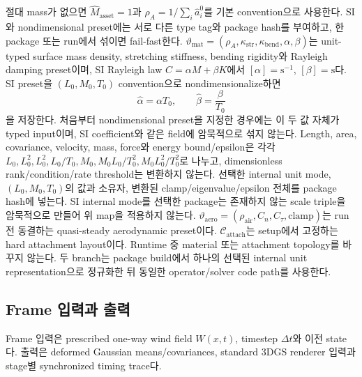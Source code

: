 \documentclass[11pt]{article}
\begin{document}
절대 mass가 없으면 \(\widehat M_{\mathrm{asset}}=1\)과
\(\widehat\rho_A=1/\sum_i\widehat a_i^0\)를 기본 convention으로 사용한다.
SI와 nondimensional preset에는 서로 다른 type tag와 package hash를 부여하고,
한 package 또는 run에서 섞이면 fail-fast한다.
\(\vartheta_{\mathrm{mat}}
=(\rho_A,\kappa_{\mathrm{str}},\kappa_{\mathrm{bend}},\alpha,\beta)\)는
unit-typed surface mass density, stretching stiffness, bending rigidity와 Rayleigh damping preset이며,
SI Rayleigh law \(C=\alpha M+\beta K\)에서
\([\alpha]=\mathrm{s}^{-1}\), \([\beta]=\mathrm{s}\)다.
SI preset을 \((L_0,M_0,T_0)\) convention으로 nondimensionalize하면
\begin{equation}
  \widehat\alpha=\alpha T_0,\qquad
  \widehat\beta=\frac{\beta}{T_0}
  \label{eq:minimal-rayleigh-unit-map}
\end{equation}
을 저장한다. 처음부터 nondimensional preset을 지정한 경우에는 이 두 값 자체가 typed input이며,
SI coefficient와 같은 field에 암묵적으로 섞지 않는다.
Length, area, covariance, velocity, mass, force와 energy bound/epsilon은 각각
\(L_0,L_0^2,L_0^2,L_0/T_0,M_0,M_0L_0/T_0^2,M_0L_0^2/T_0^2\)로 나누고,
dimensionless rank/condition/rate threshold는 변환하지 않는다. 선택한 internal unit mode,
\((L_0,M_0,T_0)\)의 값과 소유자, 변환된 clamp/eigenvalue/epsilon 전체를 package hash에 넣는다.
SI internal mode를 선택한 package는 존재하지 않는 scale triple을 암묵적으로 만들어 위 map을 적용하지 않는다.
\(\vartheta_{\mathrm{aero}}=(\rho_{\mathrm{air}},C_n,C_\tau,\text{clamp})\)는
run 전 동결하는 quasi-steady aerodynamic preset이다.
\(\mathcal C_{\mathrm{attach}}\)는 setup에서 고정하는 hard attachment layout이다.
Runtime 중 material 또는 attachment topology를 바꾸지 않는다.
두 branch는 package build에서 하나의 선택된 internal unit representation으로 정규화한 뒤
동일한 operator/solver code path를 사용한다.

\subsection{Frame 입력과 출력}

Frame 입력은 prescribed one-way wind field \(W(x,t)\), timestep \(\Delta t\)와 이전 state다.
출력은 deformed Gaussian means/covariances, standard 3DGS renderer 입력과
stage별 synchronized timing trace다.
\end{document}
